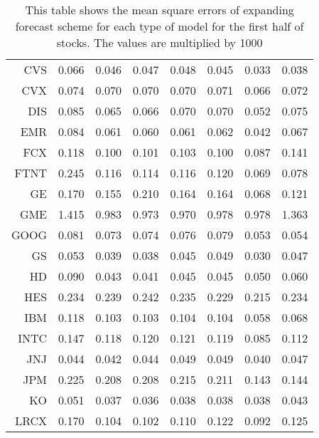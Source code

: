\begin{table}[ht]
\begin{tabular}{rrrrrrrr}
  CVS & 0.066 & 0.046 & 0.047 & 0.048 & 0.045 & 0.033 & 0.038 \\ 
  CVX & 0.074 & 0.070 & 0.070 & 0.070 & 0.071 & 0.066 & 0.072 \\ 
  DIS & 0.085 & 0.065 & 0.066 & 0.070 & 0.070 & 0.052 & 0.075 \\ 
  EMR & 0.084 & 0.061 & 0.060 & 0.061 & 0.062 & 0.042 & 0.067 \\ 
  FCX & 0.118 & 0.100 & 0.101 & 0.103 & 0.100 & 0.087 & 0.141 \\ 
  FTNT & 0.245 & 0.116 & 0.114 & 0.116 & 0.120 & 0.069 & 0.078 \\ 
  GE & 0.170 & 0.155 & 0.210 & 0.164 & 0.164 & 0.068 & 0.121 \\ 
  GME & 1.415 & 0.983 & 0.973 & 0.970 & 0.978 & 0.978 & 1.363 \\ 
  GOOG & 0.081 & 0.073 & 0.074 & 0.076 & 0.079 & 0.053 & 0.054 \\ 
  GS & 0.053 & 0.039 & 0.038 & 0.045 & 0.049 & 0.030 & 0.047 \\ 
  HD & 0.090 & 0.043 & 0.041 & 0.045 & 0.045 & 0.050 & 0.060 \\ 
  HES & 0.234 & 0.239 & 0.242 & 0.235 & 0.229 & 0.215 & 0.234 \\ 
  IBM & 0.118 & 0.103 & 0.103 & 0.104 & 0.104 & 0.058 & 0.068 \\ 
  INTC & 0.147 & 0.118 & 0.120 & 0.121 & 0.119 & 0.085 & 0.112 \\ 
  JNJ & 0.044 & 0.042 & 0.044 & 0.049 & 0.049 & 0.040 & 0.047 \\ 
  JPM & 0.225 & 0.208 & 0.208 & 0.215 & 0.211 & 0.143 & 0.144 \\ 
  KO & 0.051 & 0.037 & 0.036 & 0.038 & 0.038 & 0.038 & 0.043 \\ 
  LRCX & 0.170 & 0.104 & 0.102 & 0.110 & 0.122 & 0.092 & 0.125 \\ 
   \hline
\end{tabular}
\caption[MSE expanding forecast (1)]{This table shows the mean square errors of expanding forecast scheme for each type of model for the first half of stocks. 
                     The values are multiplied by 1000} 
\label{Table:MSE_e_1}
\end{table}
